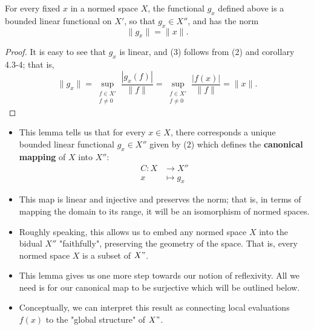 \begin{lemma}[Norm of \( g_x \)]
For every fixed \( x  \) in a normed space \( X  \), the functional \( {g}_{x} \) defined above is a bounded linear functional on \( X' \), so that \( {g}_{x} \in X'' \), and has the norm      
\[  \|{g}_{x}\| = \|x\|.  \tag{3}\]
\end{lemma}
\begin{proof}
It is easy to see that \( {g}_{x} \) is linear, and (3) follows from (2) and corollary 4.3-4; that is,
\[  \|{g}_{x}\| = \sup_{\substack{f \in X' \\ f \neq 0}} \frac{ | {g}_{x}(f) |  }{ \|f\| }  = \sup_{\substack{f \in X' \\ f \neq 0 }} \frac{ |f(x)|  }{  \|f \| }  = \|x \|. \tag{4} \]
\end{proof}

\begin{itemize}
    \item This lemma tells us that for every \( x \in X  \), there corresponds a unique bounded linear functional \( {g}_{x} \in X'' \) given by (2) which defines the \textbf{canonical mapping} of \( X  \) into \( X'' \):
        \begin{align*}
            C: X &\longrightarrow X'' \tag{5} \\
                x &\longmapsto {g}_{x}
        \end{align*}
    \item This map is linear and injective and preserves the norm; that is, in terms of mapping the domain to its range, it will be an isomorphism of normed spaces.
    \item Roughly speaking, this allows us to embed any normed space \( X  \) into the bidual \( X'' \) "faithfully", preserving the geometry of the space. That is, every normed space \( X  \) is a subset of \( X" \).
    \item This lemma gives us one more step towards our notion of reflexivity. All we need is for our canonical map to be surjective which will be outlined below.
    \item Conceptually, we can interpret this result as connecting local evaluations \( f(x) \) to the "global structure" of \( X" \).
\end{itemize}


